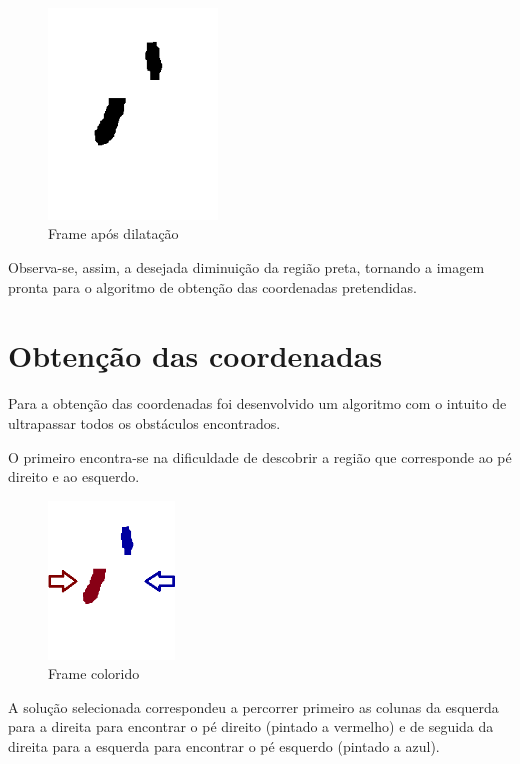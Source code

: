 \documentclass[a4paper]{report}
\begin{document}
\begin{figure}[H]
    \centering
        \includegraphics[width=0.4\textwidth]{images/building/closeDilate/finalOperation.png}
        \caption{Frame após dilatação}
        \label{img:finalOperation}
\end{figure}

Observa-se, assim, a desejada diminuição da região preta, tornando a imagem pronta para o algoritmo
de obtenção das coordenadas pretendidas.

\section{Obtenção das coordenadas}
Para a obtenção das coordenadas foi desenvolvido um algoritmo com o intuito de ultrapassar todos os
obstáculos encontrados.

O primeiro encontra-se na dificuldade de descobrir a região que corresponde ao pé direito e ao esquerdo.

\begin{figure}[H]
    \centering
        \includegraphics[width=0.3\textwidth]{images/building/coords/finalOperationColor.png}
        \caption{Frame colorido}
        \label{img:finalOperationColor}
\end{figure}

 A solução selecionada correspondeu a percorrer primeiro as colunas da esquerda para a direita para
 encontrar o pé direito (pintado a vermelho) e de seguida da direita para a esquerda para encontrar
 o pé esquerdo (pintado a azul).
 
\end{document}
